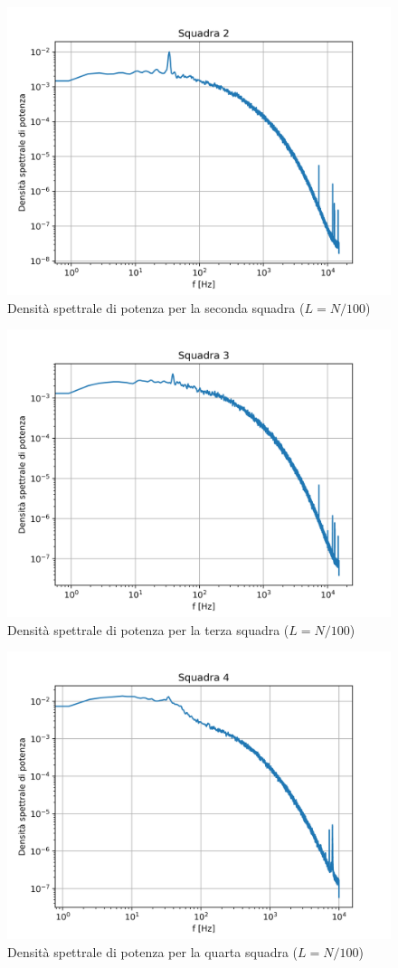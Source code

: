 \begin{figure}[H]
    \centering
    \includegraphics[width=.8\textwidth]{images/9/sq2timeserieswelchcl.png}
    \caption{Densità spettrale di potenza per la seconda squadra ($L=N/100$)}
\end{figure}

\begin{figure}[H]
    \centering
    \includegraphics[width=.8\textwidth]{images/9/sq3timeserieswelchcl.png}
    \caption{Densità spettrale di potenza per la terza squadra ($L=N/100$)}
\end{figure}

\begin{figure}[H]
    \centering
    \includegraphics[width=.7\textwidth]{images/9/sq4timeserieswelchcl.png}
    \caption{Densità spettrale di potenza per la quarta squadra ($L=N/100$)}
\end{figure}

